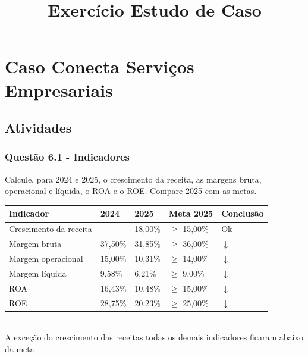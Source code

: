 
\title{Exercício Estudo de Caso}
\def\autor{Luiz Fernando Ferraz\\Oscar Sérgio Monteiro}
\def\disciplina{SC334 - Avaliação de Desempenho Organizacional, turma b}
\def\professor{Antônio César Pitela}


\chapter{Caso Conecta Serviços Empresariais}
\section{Atividades}
\subsection{Questão 6.1 - Indicadores}
Calcule, para 2024 e 2025, o crescimento da receita, as margens bruta, operacional e líquida, o ROA e o ROE. Compare 2025 com as metas.
\begin{tabular}{p{5cm} l l l l }                                                     
\toprule                                                                       
\textbf{Indicador} & \textbf{2024} &	\textbf{2025} &	 \textbf{Meta 2025} & \textbf{Conclusão} \\
\midrule
Crescimento da receita & -  & 18,00\%	& $\geq$  15,00\% & Ok \\
\midrule
Margem bruta &	37,50\% & 31,85\% & $\geq$ 36,00\% & $\downarrow$   \\
\midrule
Margem operacional & 15,00\% & 	10,31\% & $\geq$ 14,00\% & $\downarrow$  \\
\midrule
Margem líquida	& 9,58\% & 6,21\% &  $\geq$  9,00\% &	 $\downarrow$  \\
\midrule
ROA & 16,43\% &	10,48\% & $\geq$ 15,00\% &	 $\downarrow$  \\
\midrule
ROE & 28,75\% &	20,23\%	& $\geq$ 25,00\% & $\downarrow$ \\
 \bottomrule                                                                    
 \end{tabular}\\                                                                  
A exceção do crescimento das receitas todas os demais indicadores ficaram abaixo da meta\\ 
